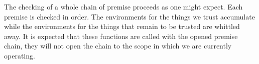 The checking of a whole chain of premise proceeds as one might expect.
Each premise is checked in order. The environments for the things we trust
accumulate while the environments for the things that remain to be trusted
are whittled away. It is expected that these functions are called with
the opened premise chain, they will not open the chain to the scope in
which we are currently operating.

\begin{code}%
\>[0]\AgdaSpace{}%
\AgdaSymbol{:}%
\>[321I]\AgdaSpace{}%
%
\>[28]\<%
\\
\>[.][@{}l@{}]\<[321I]%
\>[16]%
\>[30]\<%
\\
%
\>[16]\AgdaSpace{}%
%
\>[28]\<%
\\
%
\>[16]\AgdaSpace{}%
%
\>[28]\<%
\\
%
\>[16]\AgdaSpace{}%
\AgdaSpace{}%
\AgdaSpace{}%
\AgdaSpace{}%
\AgdaSpace{}%
%
\>[34]\<%
\\
%
\>[16]\AgdaSpace{}%
\AgdaSymbol{(}\AgdaSpace{}%
\AgdaSpace{}%
\AgdaSpace{}%
\AgdaSpace{}%
\AgdaSymbol{)}\<%
\\
\>[0]\<%
\\
\>[0]\AgdaSpace{}%
\AgdaSpace{}%
\AgdaSpace{}%
\AgdaSpace{}%
\AgdaSpace{}%
\AgdaSymbol{(}\AgdaSpace{}%
\AgdaSpace{}%
\AgdaSpace{}%
\AgdaOperator{\AgdaInductiveConstructor{[}}\AgdaSpace{}%
\AgdaSpace{}%
\AgdaOperator{\AgdaInductiveConstructor{]}}\AgdaSymbol{)}\<%
\\
\>[0][@{}l@{\AgdaIndent{0}}]%
\>[2]\AgdaSymbol{=}%
\>[345I]\<%
\\
\>[.][@{}l@{}]\<[345I]%
\>[4]\AgdaSymbol{\AgdaUnderscore{}}\AgdaSpace{}%
\AgdaSpace{}%
\AgdaSpace{}%
\AgdaSpace{}%
\AgdaSpace{}%
\AgdaSymbol{(}\AgdaSpace{}%

\end{code}
